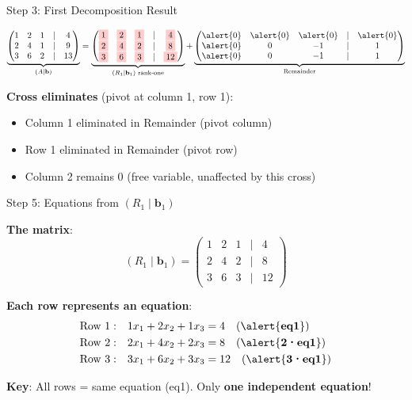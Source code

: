\documentclass[10pt]{beamer}
\theoremstyle{definition}
\newcommand{\x}[1]{\alert{\textbf{#1}}}
\begin{document}
\begin{frame}[fragile]{Step 3: First Decomposition Result}

$$\underbrace{\begin{pmatrix}
1 & 2 & 1 & | & 4 \\
2 & 4 & 1 & | & 9 \\
3 & 6 & 2 & | & 13
\end{pmatrix}}_{(A \mid \mathbf{b})} = \underbrace{\begin{pmatrix}
\colorbox{red!20}{1} & \colorbox{red!20}{2} & \colorbox{red!20}{1} & | & \colorbox{red!20}{4} \\
\colorbox{red!20}{2} & \colorbox{red!20}{4} & \colorbox{red!20}{2} & | & \colorbox{red!20}{8} \\
\colorbox{red!20}{3} & \colorbox{red!20}{6} & \colorbox{red!20}{3} & | & \colorbox{red!20}{12}
\end{pmatrix}}_{(R_1 \mid \mathbf{b}_1) \text{ rank-one}} + \underbrace{\begin{pmatrix}
\alert{0} & \alert{0} & \alert{0} & | & \alert{0} \\
\alert{0} & 0 & -1 & | & 1 \\
\alert{0} & 0 & -1 & | & 1
\end{pmatrix}}_{\text{Remainder}}$$

\vspace{0.5em}

\x{Cross eliminates} (pivot at column 1, row 1):
\begin{itemize}
\item \alert{Column 1} eliminated in Remainder (pivot column)
\item \alert{Row 1} eliminated in Remainder (pivot row)
\item Column 2 remains 0 (free variable, unaffected by this cross)
\end{itemize}

\end{frame}

\begin{frame}{Step 5: Equations from $(R_1 \mid \mathbf{b}_1)$}

\x{The matrix}:
$$(R_1 \mid \mathbf{b}_1) = \begin{pmatrix}
1 & 2 & 1 & | & 4 \\
2 & 4 & 2 & | & 8 \\
3 & 6 & 3 & | & 12
\end{pmatrix}$$

\vspace{0.5em}

\x{Each row represents an equation}:
\begin{align*}
\text{Row 1}: &\quad 1x_1 + 2x_2 + 1x_3 = 4 \quad \text{(\x{eq1})} \\
\text{Row 2}: &\quad 2x_1 + 4x_2 + 2x_3 = 8 \quad \text{(\x{2·eq1})} \\
\text{Row 3}: &\quad 3x_1 + 6x_2 + 3x_3 = 12 \quad \text{(\x{3·eq1})}
\end{align*}

\x{Key}: All rows = same equation (eq1). Only \x{one independent equation}!

\end{frame}
\end{document}
